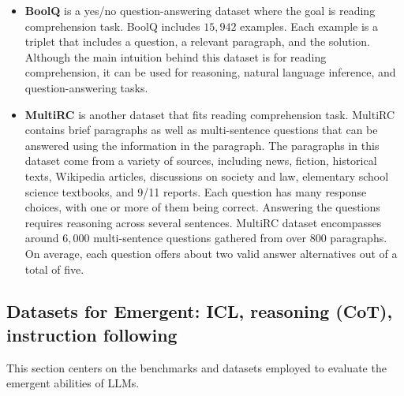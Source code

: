 \documentclass[conference]{IEEEtran}
\begin{document}
\begin{itemize}
    \item \textbf{BoolQ} \cite{DBLP:journals/corr/abs-1905-10044} is a yes/no question-answering dataset where the goal is reading comprehension task. BoolQ includes $15,942$ examples.  Each example is a triplet that includes a question, a relevant paragraph, and the solution. Although the main intuition behind this dataset is for reading comprehension, it can be used for reasoning, natural language inference, and question-answering tasks. 

    \item \textbf{MultiRC} \cite{MultiRC2018} is another dataset that fits reading comprehension task. MultiRC contains brief paragraphs as well as multi-sentence questions that can be answered using the information in the paragraph.  The paragraphs in this dataset come from a variety of sources, including news, fiction, historical texts, Wikipedia articles, discussions on society and law, elementary school science textbooks, and 9/11 reports.  Each question has many response choices, with one or more of them being correct. Answering the questions requires reasoning across several sentences. MultiRC dataset encompasses around $6,000$ multi-sentence questions gathered from over 800 paragraphs. On average, each question offers about two valid answer alternatives out of a total of five.
\end{itemize}

\subsection{Datasets for Emergent: ICL, reasoning (CoT), instruction following}
This section centers on the benchmarks and datasets employed to evaluate the emergent abilities of LLMs.
\end{document}

